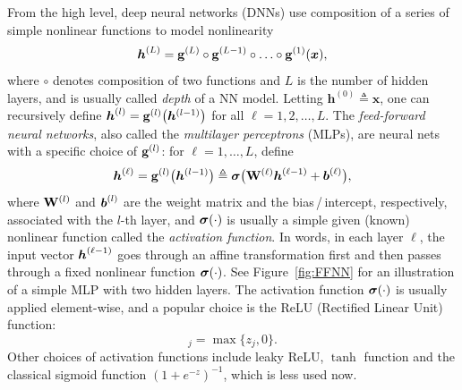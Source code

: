 From the high level, deep neural networks (DNNs) use composition of a series of simple nonlinear functions to model nonlinearity
\begin{equation*}
\text{\boldmath $h$}^{(L)} = \mathrm{\bf g}^{(L)} \circ  \mathrm{\bf g}^{(L-1)} \circ \ldots \circ \mathrm{\bf g}^{(1)} (\text{\boldmath $x$}),
\end{equation*}
where $\circ$ denotes composition of two functions and $L$ is the number of hidden layers, and is usually called \emph{depth} of a NN model. Letting $\bm{h}^{(0)}\triangleq\bm{x}$, one can recursively define
$\text{\boldmath $h$}^{(l)} =  \mathrm{\bf g}^{(l)} \big(\bm{h}^{(l-1)}\big)$ for all $\ell = 1,2,\ldots, L$. The \textit{feed-forward neural networks}, also called the \textit{multilayer perceptrons} (MLPs), are neural nets with a specific choice of $\mathrm{\bf g}^{(l)}$: for $\ell = 1,\ldots,L$, define
\begin{equation}\label{eq:fc}
\text{\boldmath $h$}^{(\ell)} = \mathrm{\bf g}^{(l)} \big(\bm{h}^{(l-1)}\big) \triangleq \bm{\sigma} \big(\mathrm{\bf W}^{(\ell)} \text{\boldmath $h$}^{(\ell-1)} + \text{\boldmath $b$}^{(\ell)}  \big),
\end{equation}
where $\mathrm{\bf W}^{(l)}$ and  $\text{\boldmath $b$}^{(l)}$ are the weight matrix and the bias$\,$/$\,$intercept, respectively, associated with the $l$-th layer, and $\bm{\sigma}(\cdot)$ is usually a simple given (known) nonlinear function called the \textit{activation function}. In words, in each layer $\ell$, the input vector $\text{\boldmath $h$}^{(\ell-1)}$ goes through an affine transformation first and then passes through a fixed nonlinear function $\bm{\sigma}(\cdot)$. See Figure~\ref{fig:FFNN} for an illustration of a simple MLP with two hidden layers. The activation function $\bm{\sigma}(\cdot)$ is usually applied element-wise, and a popular choice is the ReLU (Rectified Linear Unit) function:
\begin{equation}
[\bsigma(\zz)]_j = \max\{ z_j, 0 \}.
\end{equation}
Other choices of activation functions include leaky ReLU, $\tanh$ function \citep{maas2013rectifier} and the classical sigmoid function $(1+e^{-z})^{-1}$, which is less used now.



